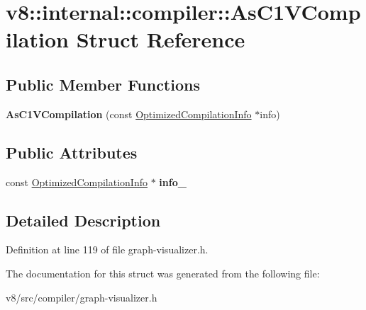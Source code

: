 \hypertarget{structv8_1_1internal_1_1compiler_1_1AsC1VCompilation}{}\section{v8\+:\+:internal\+:\+:compiler\+:\+:As\+C1\+V\+Compilation Struct Reference}
\label{structv8_1_1internal_1_1compiler_1_1AsC1VCompilation}
\subsection*{Public Member Functions}
\begin{DoxyCompactItemize}
\item 
\mbox{\label{structv8_1_1internal_1_1compiler_1_1AsC1VCompilation_a21872a2efb7d62f6ef6781b235141a5d}} 
{\bfseries As\+C1\+V\+Compilation} (const \mbox{\hyperlink{classv8_1_1internal_1_1OptimizedCompilationInfo}{Optimized\+Compilation\+Info}} $\ast$info)
\end{DoxyCompactItemize}
\subsection*{Public Attributes}
\begin{DoxyCompactItemize}
\item 
\mbox{\label{structv8_1_1internal_1_1compiler_1_1AsC1VCompilation_ad7f1d1cea43e9e911860853013c3cff6}} 
const \mbox{\hyperlink{classv8_1_1internal_1_1OptimizedCompilationInfo}{Optimized\+Compilation\+Info}} $\ast$ {\bfseries info\+\_\+}
\end{DoxyCompactItemize}


\subsection{Detailed Description}


Definition at line 119 of file graph-\/visualizer.\+h.



The documentation for this struct was generated from the following file\+:\begin{DoxyCompactItemize}
\item 
v8/src/compiler/graph-\/visualizer.\+h\end{DoxyCompactItemize}

